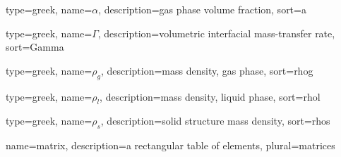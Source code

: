 {
  type=greek,
	name={\ensuremath{\alpha}},
	description={gas phase volume fraction},
	sort={a}
}	

{
  type=greek,
	name={\ensuremath{\Gamma}},
	description={volumetric interfacial mass-transfer rate},
	sort={Gamma}
}

{
  type=greek,
	name={\ensuremath{\rho_g}},
	description={mass density, gas phase},
	sort={rhog}
}

{
  type=greek,
	name={\ensuremath{\rho_l}},
	description={mass density, liquid phase},
	sort={rhol}
}

{
  type=greek,
	name={\ensuremath{\rho_{s}}},
	description={solid structure mass density},
	sort={rhos}
}

{name={matrix},%
    description={a rectangular table of elements},%
    plural={matrices}%
}


